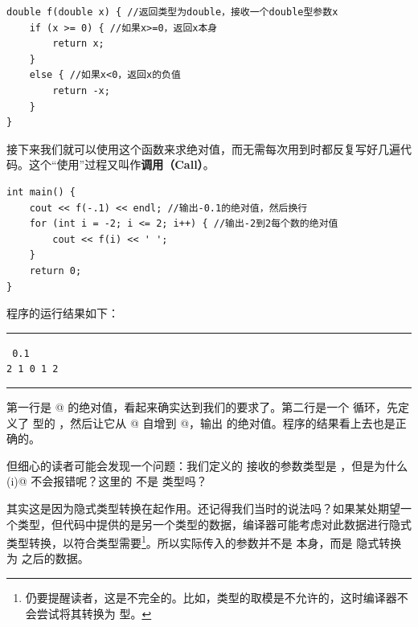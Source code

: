 \begin{lstlisting}
double f(double x) { //返回类型为double，接收一个double型参数x
    if (x >= 0) { //如果x>=0，返回x本身
        return x;
    }
    else { //如果x<0，返回x的负值
        return -x;
    }
}
\end{lstlisting}\par
接下来我们就可以使用这个函数来求绝对值，而无需每次用到时都反复写好几遍代码。这个``使用''过程又叫作\textbf{调用（Call）}。
\begin{lstlisting}
int main() {
    cout << f(-.1) << endl; //输出-0.1的绝对值，然后换行
    for (int i = -2; i <= 2; i++) { //输出-2到2每个数的绝对值
        cout << f(i) << ' ';
    }
    return 0;
}
\end{lstlisting}
程序的运行结果如下：\\\noindent\rule{\textwidth}{.2pt}\texttt{
0.1\\
2 1 0 1 2
}\\\noindent\rule{\textwidth}{.2pt}\par
第一行是 @ 的绝对值，看起来确实达到我们的要求了。第二行是一个 \lstinline@for@ 循环，先定义了 \lstinline@int@ 型的 \lstinline@i@，然后让它从 @ 自增到 @，输出 \lstinline@i@ 的绝对值。程序的结果看上去也是正确的。\par
但细心的读者可能会发现一个问题：我们定义的 \lstinline@f@ 接收的参数类型是 \lstinline@double@，但是为什么 \lstinline@f(i)@ 不会报错呢？这里的 \lstinline@i@ 不是 \lstinline@int@ 类型吗？\par
其实这是因为隐式类型转换在起作用。还记得我们当时的说法吗？如果某处期望一个类型，但代码中提供的是另一个类型的数据，编译器可能考虑对此数据进行隐式类型转换，以符合类型需要\footnote{仍要提醒读者，这是不完全的。比如，\lstinline@double@ 类型的取模是不允许的，这时编译器不会尝试将其转换为 \lstinline@int@ 型。}。所以实际传入的参数并不是 \lstinline@i@ 本身，而是 \lstinline@i@ 隐式转换为 \lstinline@double@ 之后的数据。\par
